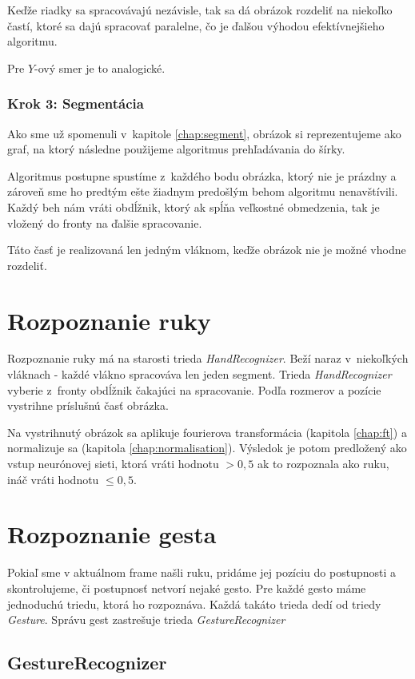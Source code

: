 Keďže riadky sa spracovávajú nezávisle, tak sa dá obrázok rozdeliť na niekoľko častí, ktoré sa dajú spracovať paralelne, čo je ďalšou výhodou efektívnejšieho algoritmu.

Pre $Y$-ový smer je to analogické. 

\subsubsection{Krok 3: Segmentácia}
Ako sme už spomenuli v~kapitole \ref{chap:segment}, obrázok si reprezentujeme ako graf, na ktorý následne použijeme algoritmus prehľadávania do šírky.

Algoritmus postupne spustíme z~každého bodu obrázka, ktorý nie je prázdny a zároveň sme ho predtým ešte žiadnym predošlým behom algoritmu nenavštívili. Každý beh nám vráti obdĺžnik, ktorý ak spĺňa veľkostné obmedzenia, tak je vložený do fronty na ďalšie spracovanie. 

Táto časť je realizovaná len jedným vláknom, keďže obrázok nie je možné vhodne rozdeliť.

\section{Rozpoznanie ruky}

Rozpoznanie ruky má na starosti trieda \textit{HandRecognizer}. Beží naraz v~niekoľkých vláknach - každé vlákno spracováva len jeden segment.
Trieda \textit{HandRecognizer} vyberie z~fronty obdĺžnik čakajúci na spracovanie. Podľa rozmerov a pozície vystrihne príslušnú časť obrázka.

Na vystrihnutý obrázok sa aplikuje fourierova transformácia (kapitola \ref{chap:ft}) a normalizuje sa (kapitola \ref{chap:normalisation}). Výsledok je potom predložený ako vstup neurónovej sieti, ktorá vráti hodnotu $>0,5$ ak to rozpoznala ako ruku, ináč vráti hodnotu $\leq 0,5$. 

\section{Rozpoznanie gesta}
Pokiaľ sme v aktuálnom frame našli ruku, pridáme jej pozíciu do postupnosti a skontrolujeme, či postupnosť netvorí nejaké gesto. Pre každé gesto máme jednoduchú triedu, ktorá ho rozpoznáva. Každá takáto trieda dedí od triedy \textit{Gesture}. Správu gest zastrešuje trieda \textit{GestureRecognizer}

\subsection{GestureRecognizer}

